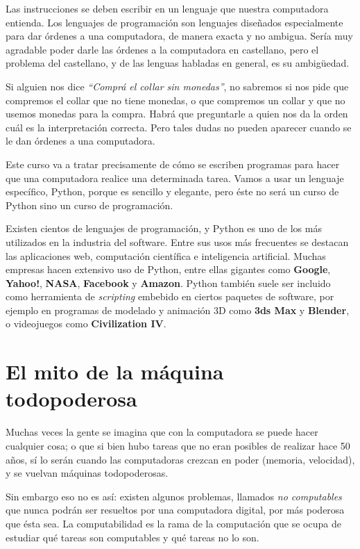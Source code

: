 Las instrucciones se deben escribir en un lenguaje que nuestra
computadora entienda. Los lenguajes de programación son
lenguajes diseñados especialmente para dar
órdenes a una computadora, de manera exacta y no ambigua. Sería
muy agradable poder darle las órdenes a la computadora en
castellano, pero el problema del castellano, y de las lenguas
habladas en general, es su ambigüedad.

Si alguien nos dice \emph{\enquote{Comprá el collar sin monedas}}, no sabremos
si nos pide que compremos el collar que no tiene monedas, o que compremos
un collar y que no usemos monedas para la compra. Habrá que preguntarle
a quien nos da la orden cuál es la interpretación correcta. Pero tales
dudas no pueden aparecer cuando se le dan órdenes a una computadora.

Este curso va a tratar precisamente de cómo se escriben programas
para hacer que una computadora realice una determinada tarea.
Vamos a usar un lenguaje específico, Python, porque es sencillo y
elegante, pero éste no será un curso de Python sino un curso de
programación.

\begin{sabias_que}
    Existen cientos de lenguajes de programación, y Python es uno de los más
    utilizados en la industria del software. Entre sus usos más frecuentes se
    destacan las aplicaciones web, computación científica e inteligencia
    artificial.  Muchas empresas hacen extensivo uso de Python, entre ellas
    gigantes como {\bf Google}, {\bf Yahoo!}, {\bf NASA}, {\bf Facebook} y
    {\bf Amazon}.  Python también suele ser incluido como herramienta de
    \emph{scripting} embebido en ciertos paquetes de software, por ejemplo en
    programas de modelado y animación 3D como {\bf 3ds Max} y {\bf Blender}, o
    videojuegos como {\bf Civilization IV}.
\end{sabias_que}

\section{El mito de la máquina todopoderosa}

Muchas veces la gente se imagina que con la computadora se puede
hacer cualquier cosa; o que si bien hubo tareas que no eran posibles de
realizar hace 50 años, sí lo serán cuando las computadoras crezcan en poder 
(memoria, velocidad), y se vuelvan máquinas todopoderosas.

Sin embargo eso no es así: existen algunos problemas, llamados
\emph{no computables} que nunca podrán ser resueltos por una
computadora digital, por más poderosa que ésta sea. La
computabilidad es la rama de la computación que se ocupa de
estudiar qué tareas son computables y qué tareas no lo son.

